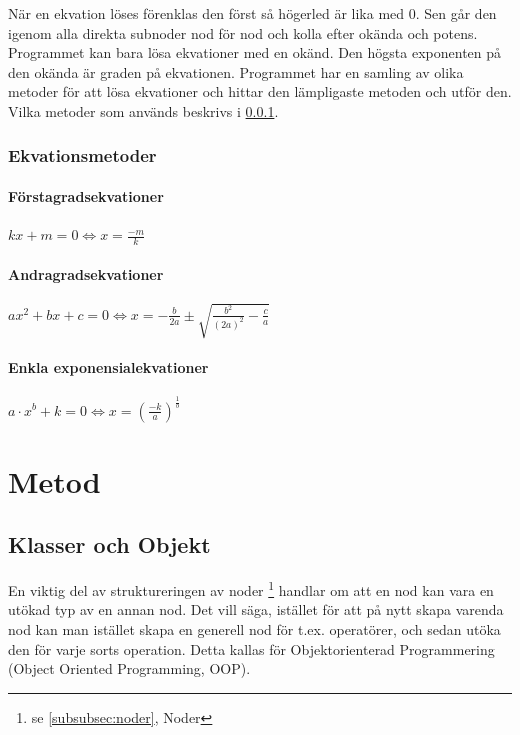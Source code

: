 \documentclass[12pt,a4paper]{article}
\begin{document}
När en ekvation löses förenklas den först så högerled är lika med 0. Sen går den igenom alla direkta subnoder nod för nod och kolla efter okända och potens. Programmet kan bara lösa ekvationer med en okänd. Den högsta exponenten på den okända är graden på ekvationen. Programmet har en samling av olika metoder för att lösa ekvationer och hittar den lämpligaste metoden och utför den. Vilka metoder som används beskrivs i \ref{subsubsec:Ekvationsmetoder}.
\subsubsection{Ekvationsmetoder}
\label{subsubsec:Ekvationsmetoder}
\paragraph{Förstagradsekvationer}
\(kx+m=0\Leftrightarrow x=\frac{-m}{k}\)
\paragraph{Andragradsekvationer}
\(ax^{2}+bx+c=0\Leftrightarrow x=-\frac{b}{2a}\pm \sqrt{\frac{b^{2}}{(2a)^{2}}-\frac{c}{a}}\)
\paragraph{Enkla exponensialekvationer}
\(a\cdot x^{b}+k=0\Leftrightarrow x=(\frac{-k}{a})^{\frac{1}{b}}\)
\section{Metod}
\subsection{Klasser och Objekt}
\label{subsection:klasserochobjekt}
En viktig del av struktureringen av noder \footnote {se \ref{subsubsec:noder}, Noder} handlar om att en nod kan vara en utökad typ av en annan nod. Det vill säga, istället för att på nytt skapa varenda nod kan man istället skapa en generell nod för t.ex. operatörer, och sedan utöka den för varje sorts operation. Detta kallas för Objektorienterad Programmering (Object Oriented Programming, OOP). 
\end{document}
